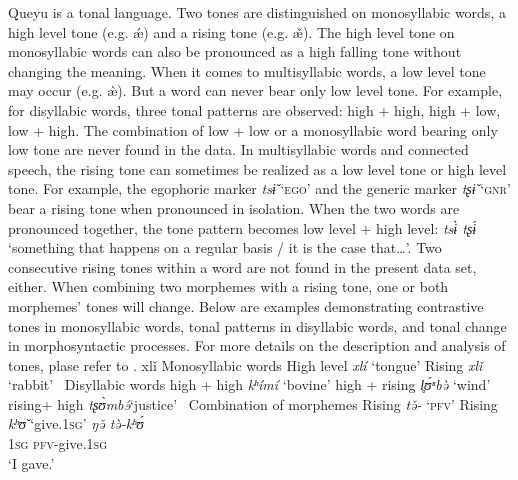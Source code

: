 \documentclass[output=paper]{langscibook}
\begin{document}
  Queyu is a tonal language. Two tones are distinguished on monosyllabic words, a high level tone (e.g. ǽ) and a rising tone (e.g. æ̌). The high level tone on monosyllabic words can also be pronounced as a high falling tone without changing the meaning. When it comes to multisyllabic words, a low level tone may occur (e.g. æ̀). But a word can never bear only low level tone. For example, for disyllabic words, three tonal patterns are observed: high + high, high + low, low + high. The combination of low + low or a monosyllabic word bearing only low tone are never found in the data. 
In multisyllabic words and connected speech, the rising tone can sometimes be realized as a low level tone or high level tone. For example, the egophoric marker \textit{tsɨ̌} ‘\textsc{ego}’ and the generic marker \textit{tʂɨ̌} ‘\textsc{gnr}’ bear a rising tone when pronounced in isolation. When the two words are pronounced together, the tone pattern becomes low level + high level: \textit{tsɨ̀ tʂɨ́} ‘something that happens on a regular basis / it is the case that…’. Two consecutive rising tones within a word are not found in the present data set, either. When combining two morphemes with a rising tone, one or both morphemes’ tones will change. Below are examples demonstrating contrastive tones in monosyllabic words, tonal patterns in disyllabic words, and tonal change in morphosyntactic processes. For more details on the description and analysis of tones, plase refer to \citet{Guan2024}.
xlǐ
\ea%
    \label{ex:guan:1}
    \ea Monosyllabic words\label{ex:guan:1a}
        \ea High level      \textit{xlí}  ‘tongue’
        \ex Rising      \textit{xlǐ{} }  ‘rabbit’
        \z
    \ex\ Disyllabic words \label{ex:guan:1b}
        \ea high + high    \textit{kʰímí}  ‘bovine’
            \ex high + rising    \textit{l̥ʊ́ʶbə̀{} }  ‘wind’
            \ex rising+ high    \textit{tʂʊ̀mbɘ́}‘justice’
        \z
    \ex\ Combination of morphemes \label{ex:guan:1c}
        \ea Rising      \textit{tə̌-{} }  ‘\textsc{pfv}’
             \ex Rising              \textit{kʰʊ̌{} }  ‘give.1\textsc{sg}’
             \ex
             \gll \textit{ŋə̌{} tə̀-kʰʊ́}\\
             1\textsc{sg} \textsc{pfv}-give.1\textsc{sg} \\
             \glt ‘I gave.’
        \z
    \z
\z
\end{document}
